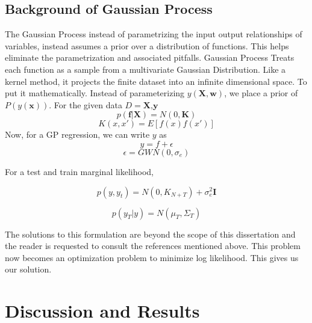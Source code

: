 \subsection{Background of Gaussian Process}
The Gaussian Process instead of parametrizing the input output relationships of variables, instead assumes a prior over a distribution of functions. This helps eliminate the parametrization and associated pitfalls. Gaussian Process Treats each function as a sample from a multivariate Gaussian Distribution. Like a kernel method, it projects the finite dataset into an infinite dimensional space. To put it mathematically. Instead of parameterizing $y(\textbf{X},\textbf{w})$, we place a prior of $P(y(\textbf{x}))$. For the given data $D = {\textbf{X},\textbf{y}}$
\begin{equation}
p(\textbf{f}|\textbf{X}) = N(0,\textbf{K})
\end{equation}    
\begin{equation}
K(x,x') = E[f(x)f(x')]
\end{equation}
Now, for a GP regression, we can write $y$ as
\begin{equation}
y = f + \epsilon
\end{equation}
\begin{equation}
\epsilon = GWN(0,\sigma_e)
\end{equation}

For a test and train marginal likelihood,

\begin{equation}
p(y,y_t) = N(0, K_{N+T}) + \sigma^2_e \textbf{I}
\end{equation}

\begin{equation}
p(y_T | y) = N(\mu_T, \Sigma_T)
\end{equation}

The solutions to this formulation are beyond the scope of this dissertation and the reader is requested to consult the references mentioned above. This problem now becomes an optimization problem to minimize log likelihood. This gives us our solution.
\section{Discussion and Results}